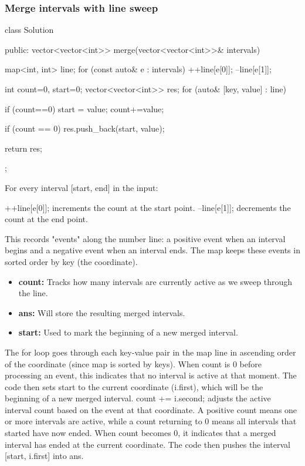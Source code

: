 \documentclass{report}
\begin{document}
\subsubsection{Merge intervals with line sweep}
\bigbreak \noindent 
\begin{cppcode}
class Solution {
public:
    vector<vector<int>> merge(vector<vector<int>>& intervals) {
        map<int, int> line;
        for (const auto& e : intervals) {
            ++line[e[0]];
            --line[e[1]];
        }

        int count=0, start=0;
        vector<vector<int>> res;
        for (auto& [key, value] : line) {
            if (count==0) {
                start = value;
            }
            count+=value;

            if (count == 0) {
                res.push_back({start, value});
            }
        }
        return res;
    }
};
\end{cppcode}
\bigbreak \noindent 
For every interval [start, end] in the input:
\begin{itemize}
    ++line[e[0]]; increments the count at the start point.
    --line[e[1]]; decrements the count at the end point.
\end{itemize}
\bigbreak \noindent 
This records "events" along the number line: a positive event when an interval begins and a negative event when an interval ends. The map keeps these events in sorted order by key (the coordinate).
\begin{itemize}
    \item \textbf{count:} Tracks how many intervals are currently active as we sweep through the line.
    \item \textbf{ans:} Will store the resulting merged intervals.
    \item \textbf{start:} Used to mark the beginning of a new merged interval.
\end{itemize}
\bigbreak \noindent 
The for loop goes through each key-value pair in the map line in ascending order of the coordinate (since map is sorted by keys).
\bigbreak \noindent 
When count is 0 before processing an event, this indicates that no interval is active at that moment. The code then sets start to the current coordinate (i.first), which will be the beginning of a new merged interval.
\bigbreak \noindent 
count += i.second; adjusts the active interval count based on the event at that coordinate.
\bigbreak \noindent 
A positive count means one or more intervals are active, while a count returning to 0 means all intervals that started have now ended.
\bigbreak \noindent 
When count becomes 0, it indicates that a merged interval has ended at the current coordinate.
\bigbreak \noindent 
The code then pushes the interval [start, i.first] into ans.
\end{document}
